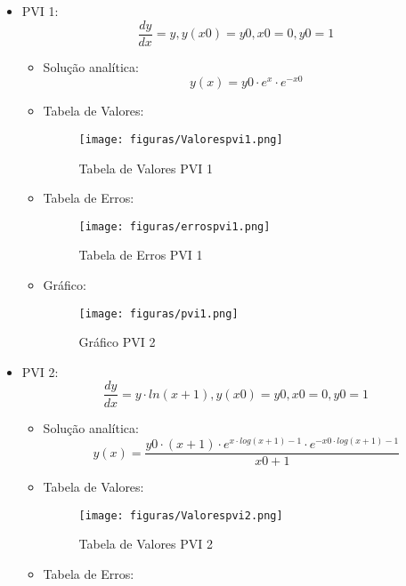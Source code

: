 \documentclass[
	12pt,				%
    oneside,			%
	a4paper,			%
	english,			%
	french,				%
	spanish,			%
	brazil,				%
	]{abntex2}
\begin{document}
\begin{itemize}
	\item PVI 1: \begin{equation} {\frac{dy}{dx} = y , y(x0) = y0}, x0 = 0, y0 = 1 \end{equation}
	\begin{itemize}
	\item Solução analítica: \begin{equation} y(x) = y0 \cdot e^{x} \cdot e^{-x0} \end{equation}
	\item Tabela de Valores:
	\begin{figure}[!htb]
     \centering
     \texttt{[image: figuras/Valorespvi1.png]}
     \caption{Tabela de Valores PVI 1}
     \label{Tabela de Valores PVI 1}
\end{figure}
	\item Tabela de Erros:
	\begin{figure}[!htb]

     \centering
     \texttt{[image: figuras/errospvi1.png]}
     \caption{Tabela de Erros PVI 1}
     \label{Tabela de Erros PVI 1}
\end{figure}
\item Gráfico:
	\begin{figure}[!htb]
     \centering
     \texttt{[image: figuras/pvi1.png]}
     \caption{Gráfico PVI 2}
     \label{Gráfico PVI 1}
\end{figure}
	\end{itemize}
	
\newpage
	
	\item PVI 2: \begin{equation} {\frac{dy}{dx} = y \cdot ln(x+1) , y(x0) = y0}, x0 = 0, y0 = 1 \end{equation}
	\begin{itemize}
	\item Solução analítica: \begin{equation} y(x) = \frac{y0 \cdot (x+1) \cdot e^{x \cdot log(x+1) -1} \cdot e^{-x0 \cdot log(x+1) -1}}{x0 + 1} \end{equation}
	\item Tabela de Valores:
	\begin{figure}[!htb]
     \centering
     \texttt{[image: figuras/Valorespvi2.png]}
     \caption{Tabela de Valores PVI 2}
     \label{Tabela de Valores PVI 2}
\end{figure}
	\item Tabela de Erros:
	\begin{figure}[!htb]


\end{figure}
\end{itemize}
\end{itemize}
\end{document}
